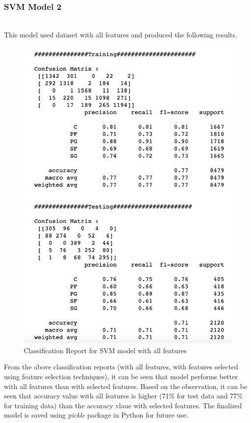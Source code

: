 \documentclass[format=sigconf]{acmart}
\begin{document}
\subsubsection{SVM Model 2}
\hfill\\
This model used dataset with all features and produced the following results.
\begin{figure}[H]
    \centering
    \includegraphics[scale=0.40]{SVM-Model-2-2-all-features.png}
    \caption{Classification Report for SVM model with all features}
    \label{fig:svmmodel22}
\end{figure}
From the above classification reports (with all features, with features selected using feature selection techniques), it can be 
seen that model performs better with all features than with selected features. Based on the observation, it can be seen 
that accuracy value with all features is higher (71\% for test data and 77\% for training data) than the accuracy vlaue with selected 
features. The finalized model is saved using \textit{pickle} package in Python for future use.
\end{document}
